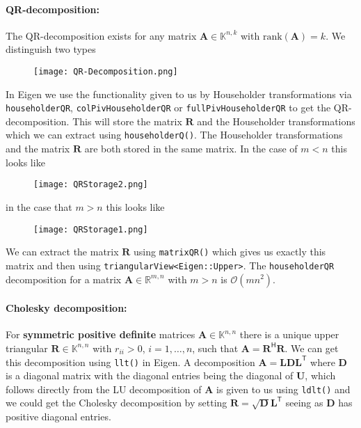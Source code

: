 \documentclass{article}
\begin{document}
\paragraph{QR-decomposition:} The QR-decomposition exists for any matrix $\mathbf{A}\in \mathbb{K}^{n,k}$ with $\text{rank}\left(\mathbf{A}\right) = k$. We distinguish two types

\begin{figure}[!hbt]
    \centering
\texttt{[image: QR-Decomposition.png]}
\end{figure}

\pagebreak

\noindent In Eigen we use the functionality given to us by Householder transformations via \verb|householderQR|, \verb|colPivHouseholderQR| or \verb|fullPivHouseholderQR| to get the QR-decomposition. This will store the matrix $\mathbf{R}$ and the Householder transformations which we can extract using \verb|householderQ()|. The Householder transformations and the matrix $\mathbf{R}$ are both stored in the same matrix. In the case of $m < n$ this looks like

\begin{figure}[!hbt]
    \centering
\texttt{[image: QRStorage2.png]}
\end{figure}

\noindent in the case that $m > n$ this looks like 

\begin{figure}[!hbt]
    \centering
\texttt{[image: QRStorage1.png]}
\end{figure}

\noindent We can extract the matrix $\mathbf{R}$ using \verb|matrixQR()| which gives us exactly this matrix and then using \verb|triangularView<Eigen::Upper>|. The \verb|householderQR| decomposition for a matrix $\mathbf{A} \in \mathbb{R}^{m,n}$ with $m > n$ is $\mathcal{O}\left(mn^{2}\right)$.

\paragraph{Cholesky decomposition:} For \textbf{symmetric positive definite} matrices  $\mathbf{A}\in \mathbb{K}^{n,n}$ there is a unique upper triangular $\mathbf{R}\in \mathbb{K}^{n,n}$ with $r_{ii} > 0$, $i = 1, \dots, n$, such that $\mathbf{A} = \mathbf{R}^{\mathsf{H}}\mathbf{R}$. We can get this decomposition using \verb|llt()| in Eigen. A decomposition $\mathbf{A} = \mathbf{L}\mathbf{D}\mathbf{L}^{\mathsf{T}}$ where $\mathbf{D}$ is a diagonal matrix with the diagonal entries being the diagonal of $\mathbf{U}$, which follows directly from the LU decomposition of $\mathbf{A}$ is given to us using \verb|ldlt()| and we could get the Cholesky decomposition by setting $\mathbf{R} = \sqrt{\mathbf{D}}\mathbf{L}^{\mathsf{T}}$ seeing as $\mathbf{D}$ has positive diagonal entries. 
\end{document}
